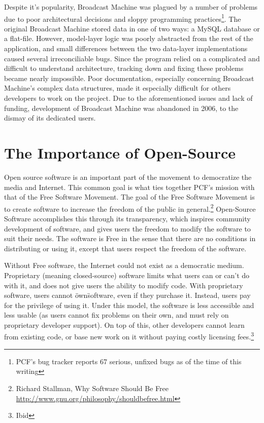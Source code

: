 \documentclass[a4paper,12pt]{report}
\begin{document}
Despite it's popularity, Broadcast Machine was plagued by a number of problems due to poor architectural decisions and sloppy programming practices\footnote{PCF's bug tracker reports 67 serious, unfixed bugs as of the time of this writing}. The original Broadcast Machine stored data in one of two ways: a MySQL database or a flat-file. However, model-layer logic was poorly abstracted from the rest of the application, and small differences between the two data-layer implementations caused several irreconciliable bugs. Since the program relied on a complicated and difficult to understand architecture, tracking down and fixing these problems became nearly impossible. Poor documentation, especially concerning Broadcast Machine's complex data structures, made it especially difficult for others developers to work on the project. Due to the aforementioned issues and lack of funding, development of Broadcast Machine was abandoned in 2006, to the dismay of its dedicated users.


\section*{The Importance of Open-Source}
Open source software is an important part of the movement to democratize the media and Internet. 
This common goal is what ties together PCF's mission with that of the Free Software Movement. 
The goal of the Free Software Movement is to create software to increase the freedom of the public in general.\footnote{Richard Stallman, Why Software Should Be Free \url{http://www.gnu.org/philosophy/shouldbefree.html}}
Open-Source Software accomplishes this through its transparency, which inspires community development of software, and gives users the freedom to modify the software to suit their needs.
The software is Free in the sense that there are no conditions in distributing or using it, except that users respect the freedom of the software.


Without Free software, the Internet could not exist as a democratic medium.
Proprietary (meaning closed-source) software limits what users can or can't do with it, and does not give users the ability to modify code.
With proprietary software, users cannot \"own\" software, even if they purchase it.
Instead, users pay for the privilege of using it.
Under this model, the software is less accessible and less usable (as users cannot fix problems on their own, and must rely on proprietary developer support).
On top of this, other developers cannot learn from existing code, or base new work on it without paying costly licensing fees.\footnote{Ibid} 
\end{document}
